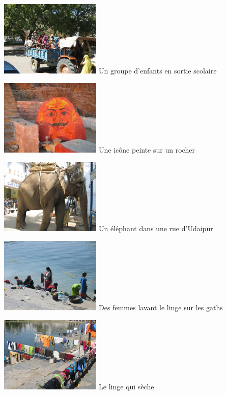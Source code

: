 \begin{multicols}{2}
\hspace*{-0.65cm}
\includegraphics[width=4.8cm]{articles/Il-commence-a-faire-chaud/scolaire.jpg}
Un groupe d'enfants en sortie scolaire

\hspace*{-0.65cm}
\includegraphics[width=4.8cm]{articles/Il-commence-a-faire-chaud/bonhommerouge.jpg}
Une icône peinte sur un rocher

\hspace*{-0.65cm}
\includegraphics[width=4.8cm]{articles/Il-commence-a-faire-chaud/elephant.jpg}
Un éléphant dans une rue d'Udaipur

\hspace*{-0.65cm}
\includegraphics[width=4.8cm]{articles/Il-commence-a-faire-chaud/linge.jpg}
Des femmes lavant le linge sur les gaths

\hspace*{-0.65cm}
\includegraphics[width=4.8cm]{articles/Il-commence-a-faire-chaud/seche.jpg}
Le linge qui sèche


\end{multicols}
